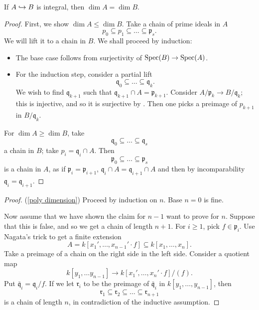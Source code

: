 \begin{prop}
  If $A \hookrightarrow B$ is integral, then $\dim A = \dim B$.
\end{prop}
\begin{proof}
  First, we show $\dim A \leq \dim B$.
  Take a chain of prime ideals in $A$
  \[ p_0 \subseteq p_1 \subseteq \dotso \subseteq \mathfrak p_s.\]
  We will lift it to a chain in $B$. We shall proceed by induction:
  \begin{itemize}
  \item The base case follows from surjectivity of $\text{Spec}(B) \to \text{Spec}(A)$.
  \item For the induction step, consider a partial lift
    \[ \mathfrak q_0 \subseteq \dotso \subseteq \mathfrak q_k.\]
    We wish to find $\mathfrak q_{k+1}$ such that $\mathfrak q_{k+1} \cap A = \mathfrak p_{k+1}$.
    Consider $A/{\mathfrak p_k} \to B/{\mathfrak q_k}$; this is injective, and so it is surjective by
    .
    Then one picks a preimage of $p_{k+1}$ in $B/{\mathfrak q_k}$.
  \end{itemize}
  For $\dim A \geq \dim B$, take
  \[ \mathfrak q_0 \subseteq \dotso \subseteq \mathfrak q_s\]
  a chain in $B$; take $p_i = \mathfrak q_i \cap A$. Then
  \[ \mathfrak p_0 \subseteq \dotso \subseteq \mathfrak p_s\]
  is a chain in $A$, as if $\mathfrak p_i = \mathfrak p_{i+1}$, $\mathfrak q_i \cap A = \mathfrak q_{i+1} \cap A$ and then by incomparability
  $\mathfrak q_i = \mathfrak q_{i+1}$.
\end{proof}

\begin{proof}(\cref{poly dimension})
  Proceed by induction on $n$. Base $n=0$ is fine.

  Now assume that we have shown the claim for $n-1$ want to prove for $n$. Suppose that this is false, and so we get a chain of length $n+1$. For $i \geq 1$, pick $f \in \mathfrak p_i$.
  Use Nagata's trick to get a finite extension
  \[ A = k[x_1', \dotsc, x_{n-1}' \cdot f] \subseteq k[x_1, \dotsc, x_n].\]
  Take a preimage of a chain on the right side in the left side.
  Consider a quotient map
  \[ k[y_1, \dotsc y_{n-1}] \to k[x_1', \dotsc, x_n' \cdot f]/{(f)}.\]
  Put $\bar{\mathfrak q}_i = \mathfrak q_i /{f}$.
  If we let $\mathfrak r_i$ to be the preimage of $\bar{\mathfrak q}_i$ in $k[y_1, \dotsc, y_{n-1}]$, then
  \[ \mathfrak r_1 \subseteq \mathfrak r_2 \subseteq \dotso \subseteq \mathfrak r_{n+1}\]
  is a chain of length $n$, in contradiction of the inductive assumption.
\end{proof}






